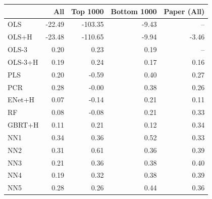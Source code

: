 \begin{tabular}{lrrrr}
\toprule
 & All & Top 1000 & Bottom 1000 & Paper (All) \\
\midrule
OLS & -22.49 & -103.35 & -9.43 & -- \\
OLS+H & -23.48 & -110.65 & -9.94 & -3.46 \\
OLS-3 & 0.20 & 0.23 & 0.19 & -- \\
OLS-3+H & 0.19 & 0.24 & 0.17 & 0.16 \\
PLS & 0.20 & -0.59 & 0.40 & 0.27 \\
PCR & 0.28 & -0.00 & 0.38 & 0.26 \\
ENet+H & 0.07 & -0.14 & 0.21 & 0.11 \\
RF & 0.08 & -0.08 & 0.21 & 0.33 \\
GBRT+H & 0.11 & 0.21 & 0.12 & 0.34 \\
NN1 & 0.34 & 0.36 & 0.52 & 0.33 \\
NN2 & 0.31 & 0.61 & 0.36 & 0.39 \\
NN3 & 0.21 & 0.36 & 0.38 & 0.40 \\
NN4 & 0.19 & 0.32 & 0.38 & 0.39 \\
NN5 & 0.28 & 0.26 & 0.44 & 0.36 \\
\bottomrule
\end{tabular}
